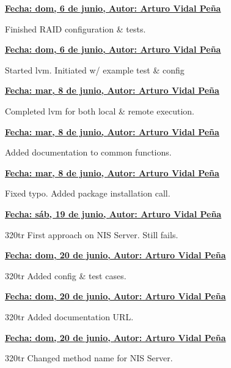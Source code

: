 \item \textbf{\underline{\underline{Fecha:} dom,  6 de junio, \underline{Autor:} Arturo Vidal Peña}}\\\item[] Finished RAID configuration \& tests.\\
\item \textbf{\underline{\underline{Fecha:} dom,  6 de junio, \underline{Autor:} Arturo Vidal Peña}}\\\item[] Started lvm. Initiated w/ example test \& config\\
\item \textbf{\underline{\underline{Fecha:} mar,  8 de junio, \underline{Autor:} Arturo Vidal Peña}}\\\item[] Completed lvm for both local \& remote execution.\\
\item \textbf{\underline{\underline{Fecha:} mar,  8 de junio, \underline{Autor:} Arturo Vidal Peña}}\\\item[] Added documentation to common functions.\\
\item \textbf{\underline{\underline{Fecha:} mar,  8 de junio, \underline{Autor:} Arturo Vidal Peña}}\\\item[] Fixed typo. Added package installation call.\\
\item \textbf{\underline{\underline{Fecha:} sáb, 19 de junio, \underline{Autor:} Arturo Vidal Peña}}\\\item[]320tr First approach on NIS Server. Still fails.\\
\item \textbf{\underline{\underline{Fecha:} dom, 20 de junio, \underline{Autor:} Arturo Vidal Peña}}\\\item[]320tr Added config \& test cases.\\
\item \textbf{\underline{\underline{Fecha:} dom, 20 de junio, \underline{Autor:} Arturo Vidal Peña}}\\\item[]320tr Added documentation URL.\\
\item \textbf{\underline{\underline{Fecha:} dom, 20 de junio, \underline{Autor:} Arturo Vidal Peña}}\\\item[]320tr Changed method name for NIS Server.\\

